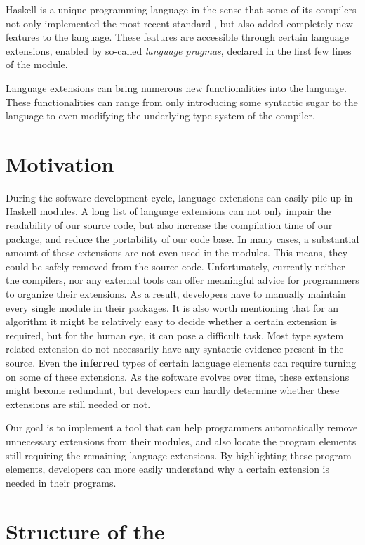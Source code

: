 \documentclass[main.tex]{subfiles}
\begin{document}
	
	Haskell is a unique programming language in the sense that some of its compilers not only implemented the most recent standard \cite{haskell2010-bib}, but also added completely new features to the language. These features are accessible through certain language extensions, enabled by so-called \emph{language pragmas}, declared in the first few lines of the module.
	
	Language extensions can bring numerous new functionalities into the language. These functionalities can range from only introducing some syntactic sugar to the language to even modifying the underlying type system of the compiler. 
	
	\section{Motivation}
	
	During the software development cycle, language extensions can easily pile up in Haskell modules. A long list of language extensions can not only impair the readability of our source code, but also increase the compilation time of our package, and reduce the portability of our code base. In many cases, a substantial amount of these extensions are not even used in the modules. This means, they could be safely removed from the source code. Unfortunately, currently neither the compilers, nor any external tools can offer meaningful advice for programmers to organize their extensions. As a result, developers have to manually maintain every single module in their packages. It is also worth mentioning that for an algorithm it might be relatively easy to decide whether a certain extension is required, but for the human eye, it can pose a difficult task. Most type system related extension do not necessarily have any syntactic evidence present in the source. Even the \textbf{inferred} types of certain language elements can require turning on some of these extensions. As the software evolves over time, these extensions might become redundant, but developers can hardly determine whether these extensions are still needed or not.
	
	Our goal is to implement a tool that can help programmers automatically remove unnecessary extensions from their modules, and also locate the program elements still requiring the remaining language extensions. By highlighting these program elements, developers can more easily understand why a certain extension is needed in their programs.
	
	\section{Structure of the \paper{}}
	
\end{document}
